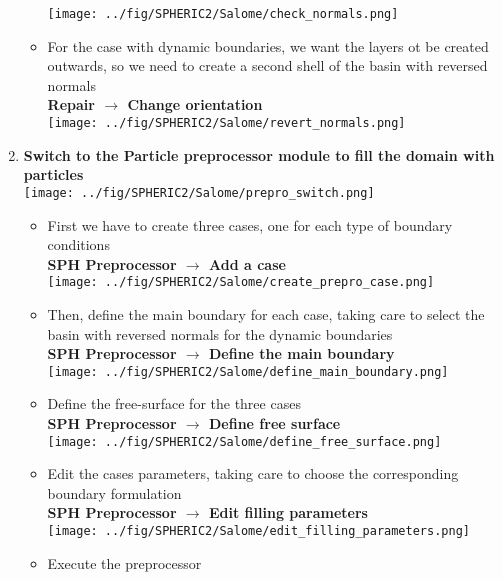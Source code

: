 \documentclass{../GPUSPHtemplate}
\begin{document}
\begin{enumerate}
\begin{itemize}
    \texttt{[image: ../fig/SPHERIC2/Salome/check\_normals.png]}
  \item For the case with dynamic boundaries, we want the layers ot be created outwards, so we need to
    create a second shell of the basin with reversed normals\\
    \textbf{Repair $\to$ Change orientation}\smallskip\\
    \texttt{[image: ../fig/SPHERIC2/Salome/revert\_normals.png]}
  \end{itemize}
\item \textbf{Switch to the Particle preprocessor module to fill the domain with particles}\smallskip\\
  \texttt{[image: ../fig/SPHERIC2/Salome/prepro\_switch.png]}
  \begin{itemize}
  \item First we have to create three cases, one for each type of boundary conditions\\
    \textbf{SPH Preprocessor $\to$ Add a case}\smallskip\\
    \texttt{[image: ../fig/SPHERIC2/Salome/create\_prepro\_case.png]}
  \item Then, define the main boundary for each case, taking care to select the basin with reversed normals for the dynamic boundaries\\
    \textbf{SPH Preprocessor $\to$ Define the main boundary}\smallskip\\
    \texttt{[image: ../fig/SPHERIC2/Salome/define\_main\_boundary.png]}
  \item Define the free-surface for the three cases\\
    \textbf{SPH Preprocessor $\to$ Define free surface}\smallskip\\
    \texttt{[image: ../fig/SPHERIC2/Salome/define\_free\_surface.png]}
  \item Edit the cases parameters, taking care to choose the corresponding boundary formulation\\
    \textbf{SPH Preprocessor $\to$ Edit filling parameters}\\
    \texttt{[image: ../fig/SPHERIC2/Salome/edit\_filling\_parameters.png]}
  \item Execute the preprocessor\\

\end{itemize}
\end{enumerate}
\end{document}
